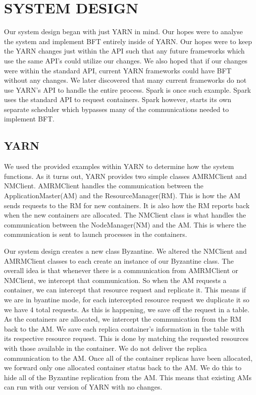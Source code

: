 \documentclass{sig-alternate}
\begin{document}
\section {SYSTEM DESIGN}
\label{sec:method}

Our system design began with just YARN in mind. Our hopes were to analyse the system and implement BFT entirely inside of YARN. Our hopes were to 
keep the YARN changes just within the API such that any future frameworks which use the same API's could utilize our changes. We also hoped that if 
our changes were within the standard API, current YARN frameworks could have BFT without any changes. We later discovered that many current frameworks 
do not use YARN's API to handle the entire process. Spark is once such example. Spark uses the standard API to request containers. 
Spark however, starts its own separate scheduler which bypasses many of the communications needed to implement BFT.

\subsection{YARN}
We used the provided examples within YARN to determine how the system functions. As it turns out, YARN provides two simple classes AMRMClient and 
NMClient. AMRMClient handles the communication between the ApplicationMaster(AM) and the ResourceManager(RM). This is how the AM sends requests to the RM
for new containers. It is also how the RM reports back when the new containers are allocated. The NMClient class is what handles the communication between
the NodeManager(NM) and the AM. This is where the communication is sent to launch processes in the containers. 

Our system design creates a new class Byzantine. We altered the NMClient and AMRMClient classes to each create an instance of our Byzantine class. The overall idea
is that whenever there is a communication from AMRMClient or NMClient, we intercept that communication. So when the AM requests a container, we can intercept that
resource request and replicate it. This means if we are in byantine mode, for each intercepted resource request we duplicate it so we have 4 total requests. As this is happening, 
we save off the request in a table. As the containers are allocated, we intercept the communication from the RM back to the AM. We save each replica container's information
in the table with its respective resource request. This is done by matching the requested resources with those available in the container. 
We do not deliver the replica communication to the AM. Once all of the 
container replicas have been allocated, we forward only one allocated container status back to the AM. We do this to hide all of the Byzantine replication from the AM. This means 
that existing AMs can run with our version of YARN with no changes. 
\end{document}
